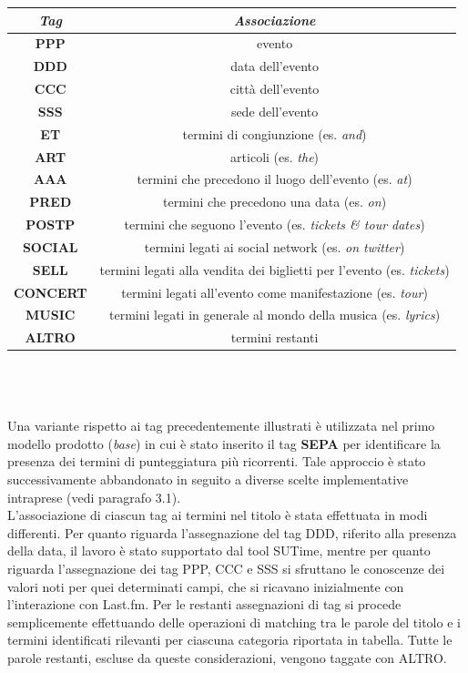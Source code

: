 \documentclass[a4paper]{report}
\begin{document}
\begin{tabular}{|c|c|}
\hline
\textit{Tag} & \textit{Associazione}\\
\hline
\textbf{PPP} & evento\\
\hline
\textbf{DDD} & data dell'evento\\
\hline
\textbf{CCC} & città dell'evento\\
\hline
\textbf{SSS} & sede dell'evento\\
\hline
\textbf{ET} & termini di congiunzione (es. \textit{and})\\
\hline
\textbf{ART} & articoli (es. \textit{the})\\
\hline
\textbf{AAA} & termini che precedono il luogo dell'evento (es. \textit{at})\\
\hline
\textbf{PRED} & termini che precedono una data (es. \textit{on})\\
\hline
\textbf{POSTP} & termini che seguono l'evento (es. \textit{tickets \& tour dates})\\
\hline
\textbf{SOCIAL} & termini legati ai social network (es. \textit{on twitter})\\
\hline
\textbf{SELL} & termini legati alla vendita dei biglietti per l'evento (es. \textit{tickets})\\
\hline
\textbf{CONCERT} & termini legati all'evento come manifestazione (es. \textit{tour})\\
\hline
\textbf{MUSIC} & termini legati in generale al mondo della musica (es. \textit{lyrics})\\
\hline
\textbf{ALTRO} & termini restanti\\
\hline
\end{tabular}
\\ \\ \\
Una variante rispetto ai tag precedentemente illustrati è utilizzata nel primo modello prodotto (\textit{base}) in cui è stato inserito il tag \textbf{SEPA} per identificare la presenza dei termini di punteggiatura più ricorrenti. Tale approccio è stato successivamente abbandonato in seguito a diverse scelte implementative intraprese (vedi paragrafo 3.1). \\
L'associazione di ciascun tag ai termini nel titolo è stata effettuata in modi differenti. Per quanto riguarda l'assegnazione del tag DDD, riferito alla presenza della data, il lavoro è stato supportato dal tool SUTime, mentre per quanto riguarda l'assegnazione dei tag PPP, CCC e SSS si sfruttano le conoscenze dei valori noti per quei determinati campi, che si ricavano inizialmente con l'interazione con Last.fm. Per le restanti assegnazioni di tag si procede semplicemente effettuando delle operazioni di matching tra le parole del titolo e i termini identificati rilevanti per ciascuna categoria riportata in tabella. Tutte le parole restanti, escluse da queste considerazioni, vengono taggate con ALTRO. \\
\end{document}
